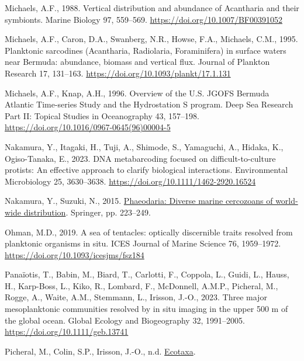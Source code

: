 \documentclass[
]{article}
\newlength{\cslhangindent}
\newlength{\cslentryspacingunit} %
\newenvironment{CSLReferences}[2] %
 {%
  \setlength{\parindent}{0pt}
  \ifodd #1
  \let\oldpar\par
  \def\par{\hangindent=\cslhangindent\oldpar}
  \fi
  \setlength{\parskip}{#2\cslentryspacingunit}
 }%
 {}
\begin{document}
\begin{CSLReferences}{1}{0}
\leavevmode{}%
Michaels, A.F., 1988. Vertical distribution and abundance of Acantharia
and their symbionts. Marine Biology 97, 559--569.
\url{https://doi.org/10.1007/BF00391052}

\leavevmode{}%
Michaels, A.F., Caron, D.A., Swanberg, N.R., Howse, F.A., Michaels,
C.M., 1995. Planktonic sarcodines (Acantharia, Radiolaria, Foraminifera)
in surface waters near Bermuda: abundance, biomass and vertical flux.
Journal of Plankton Research 17, 131--163.
\url{https://doi.org/10.1093/plankt/17.1.131}

\leavevmode{}%
Michaels, A.F., Knap, A.H., 1996. Overview of the U.S. JGOFS Bermuda
Atlantic Time-series Study and the Hydrostation S program. Deep Sea
Research Part II: Topical Studies in Oceanography 43, 157--198.
\url{https://doi.org/10.1016/0967-0645(96)00004-5}

\leavevmode{}%
Nakamura, Y., Itagaki, H., Tuji, A., Shimode, S., Yamaguchi, A., Hidaka,
K., Ogiso-Tanaka, E., 2023. DNA metabarcoding focused on
difficult-to-culture protists: An effective approach to clarify
biological interactions. Environmental Microbiology 25, 3630--3638.
\url{https://doi.org/10.1111/1462-2920.16524}

\leavevmode{}%
Nakamura, Y., Suzuki, N., 2015.
\href{https://link.springer.com/chapter/10.1007/978-4-431-55130-0_9}{Phaeodaria:
Diverse marine cercozoans of world-wide distribution}. Springer, pp.
223--249.

\leavevmode{}%
Ohman, M.D., 2019. A sea of tentacles: optically discernible traits
resolved from planktonic organisms in situ. ICES Journal of Marine
Science 76, 1959--1972. \url{https://doi.org/10.1093/icesjms/fsz184}

\leavevmode{}%
Panaïotis, T., Babin, M., Biard, T., Carlotti, F., Coppola, L., Guidi,
L., Hauss, H., Karp-Boss, L., Kiko, R., Lombard, F., McDonnell, A.M.P.,
Picheral, M., Rogge, A., Waite, A.M., Stemmann, L., Irisson, J.-O.,
2023. Three major mesoplanktonic communities resolved by in situ imaging
in the upper 500 m of the global ocean. Global Ecology and Biogeography
32, 1991--2005. \url{https://doi.org/10.1111/geb.13741}

\leavevmode{}%
Picheral, M., Colin, S.P., Irisson, J.-O., n.d.
\href{https://ecotaxa.obs-vlfr.fr/}{Ecotaxa}.


\end{CSLReferences}
\end{document}
